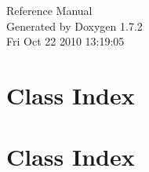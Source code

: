 \documentclass[a4paper]{book}
\begin{document}
\hypersetup{pageanchor=false}
\begin{titlepage}
\vspace*{7cm}
\begin{center}
{\Large Reference Manual}\\
\vspace*{1cm}
{\large Generated by Doxygen 1.7.2}\\
\vspace*{0.5cm}
{\small Fri Oct 22 2010 13:19:05}\\
\end{center}
\end{titlepage}
\clearemptydoublepage
{}
\tableofcontents
\clearemptydoublepage
{}
\hypersetup{pageanchor=true}
\chapter{Class Index}

\chapter{Class Index}

\end{document}
